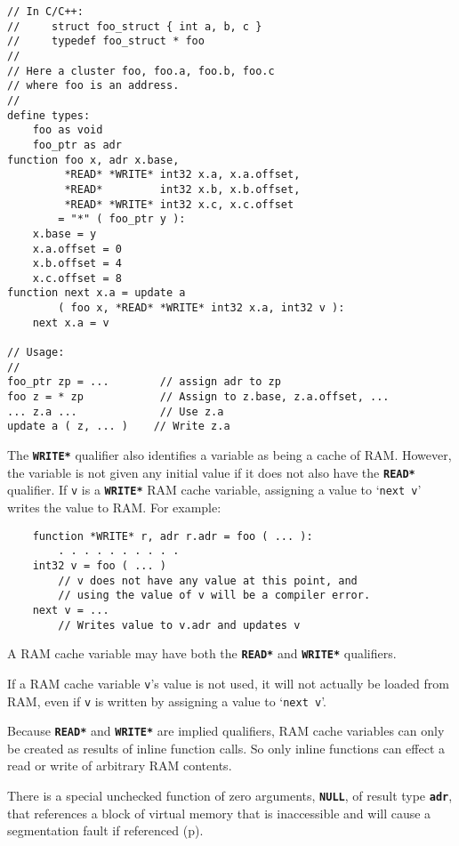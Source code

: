 \documentclass[12pt]{article}
\makeatletter
\newcommand{\TT}[1]{{\tt \bfseries #1}}
\newcommand{\ttakey}[1]{\TT{*#1*}\index{#1@{\tt *#1*}}}
\newcommand{\pagref}[1]{p\pageref{#1}}
\newenvironment{indpar}[1][0.3in]%
	{\begin{list}{}%
		     {\setlength{\itemsep}{0in}%
		      \setlength{\topsep}{0in}%
		      \setlength{\parsep}{1ex}%
		      \setlength{\labelwidth}{#1}%
		      \setlength{\leftmargin}{#1}%
		      \addtolength{\leftmargin}{\labelsep}}%
	 \item}%
	{\end{list}}
\makeatother
\begin{document}
\begin{indpar}\begin{verbatim}
// In C/C++:
//     struct foo_struct { int a, b, c }
//     typedef foo_struct * foo
//
// Here a cluster foo, foo.a, foo.b, foo.c
// where foo is an address.
//
define types:
    foo as void
    foo_ptr as adr
function foo x, adr x.base,
         *READ* *WRITE* int32 x.a, x.a.offset,
         *READ*         int32 x.b, x.b.offset,
         *READ* *WRITE* int32 x.c, x.c.offset
        = "*" ( foo_ptr y ):
    x.base = y
    x.a.offset = 0
    x.b.offset = 4
    x.c.offset = 8
function next x.a = update a
        ( foo x, *READ* *WRITE* int32 x.a, int32 v ):
    next x.a = v

// Usage:
//
foo_ptr zp = ...        // assign adr to zp
foo z = * zp            // Assign to z.base, z.a.offset, ...
... z.a ...             // Use z.a
update a ( z, ... )    // Write z.a

\end{verbatim}\end{indpar}

The \ttakey{WRITE} qualifier also identifies a variable as
being a cache of RAM.  However, the
variable is not given any initial value if it does not
also have the \TT{*READ*} qualifier.
If {\tt v} is a \ttakey{WRITE}
RAM cache variable, assigning a value to `{\tt next v}'
writes the value to RAM.  For example:

\begin{indpar}\begin{verbatim}
    function *WRITE* r, adr r.adr = foo ( ... ):
        . . . . . . . . . .
    int32 v = foo ( ... )
        // v does not have any value at this point, and
        // using the value of v will be a compiler error.
    next v = ...      
        // Writes value to v.adr and updates v
\end{verbatim}\end{indpar}

A RAM cache variable may have both the \TT{*READ*} and \TT{*WRITE*}
qualifiers.

If a RAM cache variable {\tt v}'s value is not used,
it will not actually be loaded from RAM, even if {\tt v} is written
by assigning a value to `{\tt next v}'.

Because \TT{*READ*} and \TT{*WRITE*} are implied qualifiers,
RAM cache variables can only be created as
results of inline function calls.
So only inline functions can effect a read or write
of arbitrary RAM contents.

There is a special unchecked function of zero arguments, \TT{NULL}, of result
type \TT{adr}, that
references a block of virtual memory that is
inaccessible and will cause a segmentation fault if referenced
(\pagref{NULL}).
\end{document}
